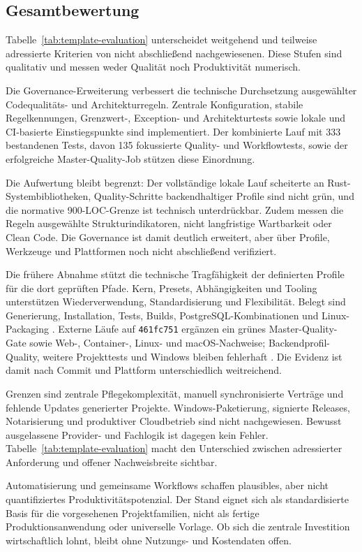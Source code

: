 \subsection{Gesamtbewertung}
\label{subsec:gesamtbewertung}

Tabelle~\ref{tab:template-evaluation} unterscheidet weitgehend und teilweise
adressierte Kriterien von nicht abschließend nachgewiesenen. Diese Stufen sind
qualitativ und messen weder Qualität noch Produktivität numerisch.



Die Governance-Erweiterung verbessert die technische Durchsetzung ausgewählter
Codequalitäts- und Architekturregeln. Zentrale Konfiguration, stabile
Regelkennungen, Grenzwert-, Exception- und Architekturtests sowie lokale und
CI-basierte Einstiegspunkte sind implementiert. Der kombinierte Lauf mit 333
bestandenen Tests, davon 135 fokussierte Quality- und Workflowtests, sowie der
erfolgreiche Master-Quality-Job stützen diese Einordnung.

Die Aufwertung bleibt begrenzt: Der vollständige lokale Lauf scheiterte an
Rust-Systembibliotheken, Quality-Schritte backendhaltiger Profile sind nicht
grün, und die normative 900-LOC-Grenze ist technisch unterdrückbar. Zudem
messen die Regeln ausgewählte Strukturindikatoren, nicht langfristige
Wartbarkeit oder Clean Code. Die Governance ist damit deutlich erweitert, aber
über Profile, Werkzeuge und Plattformen noch nicht abschließend verifiziert.

Die frühere Abnahme stützt die technische Tragfähigkeit der definierten Profile
für die dort geprüften Pfade. Kern, Presets, Abhängigkeiten und Tooling
unterstützen Wiederverwendung, Standardisierung und Flexibilität. Belegt sind
Generierung, Installation, Tests, Builds, PostgreSQL-Kombinationen und
Linux-Packaging
\parencite{kleiveist2026acceptance}. Externe Läufe auf \texttt{461fc751}
ergänzen ein grünes Master-Quality-Gate sowie Web-, Container-, Linux- und
macOS-Nachweise; Backendprofil-Quality, weitere Projekttests und Windows
bleiben fehlerhaft
\parencite{kleiveist2026governance-core-run,kleiveist2026governance-profiles-run,kleiveist2026governance-desktop-run}.
Die Evidenz ist damit nach Commit und Plattform unterschiedlich weitreichend.

Grenzen sind zentrale Pflegekomplexität, manuell synchronisierte Verträge und
fehlende Updates generierter Projekte. Windows-Paketierung, signierte Releases,
Notarisierung und produktiver Cloudbetrieb sind nicht nachgewiesen. Bewusst
ausgelassene Provider- und Fachlogik ist dagegen kein Fehler.
Tabelle~\ref{tab:template-evaluation} macht den Unterschied zwischen
adressierter Anforderung und offener Nachweisbreite sichtbar.

Automatisierung und gemeinsame Workflows schaffen plausibles, aber nicht
quantifiziertes Produktivitätspotenzial. Der Stand eignet sich als
standardisierte Basis für die vorgesehenen Projektfamilien, nicht als fertige
Produktionsanwendung oder universelle Vorlage.
Ob sich die zentrale Investition wirtschaftlich lohnt, bleibt ohne Nutzungs-
und Kostendaten offen.

